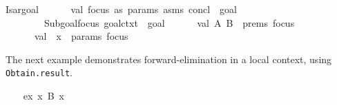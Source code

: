 \begin{isabellebody}
\isaantiq
Isar{}goal{}%
\endisaantiq
{}\isanewline
\ \ \ \ \ \ val\ {}focus\ as\ {}params{}\ asms{}\ concl{}\ {}{}{}{}{}\ goal{}{}\ {}\isanewline
\ \ \ \ \ \ \ \ Subgoal{}focus\ goal{}ctxt\ {}\ goal{}\isanewline
\ \ \ \ \ \ val\ {}A{}\ B{}\ {}\ {}prems\ focus{}\isanewline
\ \ \ \ \ \ val\ {}{}{}{}\ x{}{}\ {}\ {}params\ focus{}\isanewline
\ \ \ \ {}%
\endisatagML
{\isafoldML}%
%
\isadelimML
\isanewline
%
\endisadelimML
%
\isadelimproof
\ \ \ \ %
\endisadelimproof
%
\isatagproof
{}\isamarkupfalse%
%
\endisatagproof
{\isafoldproof}%
%
\isadelimproof
%
\endisadelimproof
%
\begin{isamarkuptext}%
\medskip The next example demonstrates forward-elimination in
  a local context, using \verb|Obtain.result|.%
\end{isamarkuptext}%
\isamarkuptrue%
\isamarkupfalse%
\isanewline
%
\isadelimproof
\ \ %
\endisadelimproof
%
\isatagproof
{}\isamarkupfalse%
\ ex{}\ {}{}x{}\ B\ x{}%
\endisatagproof
{\isafoldproof}%
%
\isadelimproof
\isanewline
%
\endisadelimproof
%
\isadelimML
\isanewline
\ \ %
\endisadelimML
%
\isatagML
{}\isamarkupfalse%
\ {}\isanewline

\end{isabellebody}
